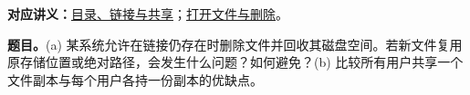 
\begingroup
\setlength{\parskip}{0.4em}
\renewcommand{\recordid}[1]{}
\renewcommand{\relatedtopic}[2]{\hyperref[topic:#1]{#2}}

\label{tutorial:SC2005-TUT11}



\textbf{对应讲义：}\relatedtopic{SC2005-L20-T02}{目录、链接与共享}；\relatedtopic{SC2005-L20-T04}{打开文件与删除}。

\textbf{题目。}(a) 某系统允许在链接仍存在时删除文件并回收其磁盘空间。若新文件复用原存储位置或绝对路径，会发生什么问题？如何避免？(b) 比较所有用户共享一个文件副本与每个用户各持一份副本的优缺点。

